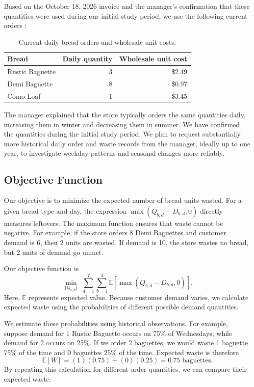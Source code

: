 \documentclass[11pt]{article}
\begin{document}
Based on the October 18, 2026 invoice and the manager's confirmation that these quantities were used during our initial study period, we use the following current orders \cite{invoice2026}:

\begin{table}[htbp]
\centering
\caption{Current daily bread orders and wholesale unit costs.}
\begin{tabular}{@{}lrr@{}}
\toprule
Bread & Daily quantity & Wholesale unit cost \\
\midrule
Rustic Baguette & 3 & \$2.49 \\
Demi Baguette & 8 & \$0.97 \\
Como Loaf & 1 & \$3.45 \\
\bottomrule
\end{tabular}
\end{table}

The manager explained that the store typically orders the same quantities daily, increasing them in winter and decreasing them in summer. We have confirmed the quantities during the initial study period. We plan to request substantially more historical daily order and waste records from the manager, ideally up to one year, to investigate weekday patterns and seasonal changes more reliably.

\subsection{Objective Function}

Our objective is to minimize the expected number of bread units wasted. For a given bread type and day, the expression $\max(Q_{b,d}-D_{b,d},0)$ directly measures leftovers. The maximum function ensures that waste cannot be negative. For example, if the store orders 8 Demi Baguettes and customer demand is 6, then 2 units are wasted. If demand is 10, the store wastes no bread, but 2 units of demand go unmet.

Our objective function is
\begin{equation}
\boxed{\min_{\{Q_{b,d}\}}\;\sum_{d=1}^{7}\sum_{b=1}^{3}\mathbb{E}\!\left[\max\left(Q_{b,d}-D_{b,d},0\right)\right].}
\label{eq:objective}
\end{equation}
Here, $\mathbb{E}$ represents expected value. Because customer demand varies, we calculate expected waste using the probabilities of different possible demand quantities.

We estimate these probabilities using historical observations. For example, suppose demand for 1 Rustic Baguette occurs on 75\% of Wednesdays, while demand for 2 occurs on 25\%. If we order 2 baguettes, we would waste 1 baguette 75\% of the time and 0 baguettes 25\% of the time. Expected waste is therefore
\begin{equation}
\mathbb{E}[W]=(1)(0.75)+(0)(0.25)=0.75\text{ baguettes}.
\end{equation}
By repeating this calculation for different order quantities, we can compare their expected waste.
\end{document}
